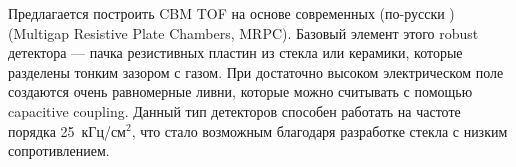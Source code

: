 
Предлагается построить CBM TOF на основе современных (по-русски \todo) (Multigap Resistive Plate Chambers, MRPC). Базовый элемент этого robust \todo детектора --- пачка резистивных пластин из стекла или керамики, которые разделены тонким зазором с газом. При достаточно высоком электрическом поле создаются очень равномерные ливни, которые можно считывать с помощью capacitive coupling.
Данный тип детекторов способен работать на частоте порядка 25~кГц/см$^2$, что стало возможным благодаря разработке стекла с низким сопротивлением.





